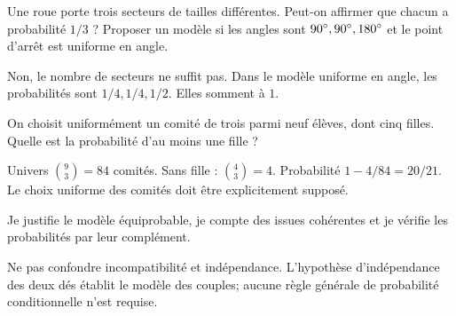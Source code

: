 \label{t11s-c20-e06}
Une roue porte trois secteurs de tailles différentes. Peut-on affirmer que chacun a probabilité $1/3$ ? Proposer un modèle si les angles sont $90^{\circ},90^{\circ},180^{\circ}$ et le point d’arrêt est uniforme en angle.
\begin{corrige}\label{sol-t11s-c20-e06}
Non, le nombre de secteurs ne suffit pas. Dans le modèle uniforme en angle, les probabilités sont $1/4,1/4,1/2$. Elles somment à $1$.
\end{corrige}
\label{t11s-c20-e07}
On choisit uniformément un comité de trois parmi neuf élèves, dont cinq filles. Quelle est la probabilité d’au moins une fille ?
\begin{corrige}\label{sol-t11s-c20-e07}
Univers $\binom93=84$ comités. Sans fille : $\binom43=4$. Probabilité $1-4/84=20/21$. Le choix uniforme des comités doit être explicitement supposé.
\end{corrige}
\begin{jemeteste}Je justifie le modèle équiprobable, je compte des issues cohérentes et je vérifie les probabilités par leur complément.\end{jemeteste}
\begin{notepourlaclasse}Ne pas confondre incompatibilité et indépendance. L’hypothèse d’indépendance des deux dés établit le modèle des couples; aucune règle générale de probabilité conditionnelle n’est requise.\end{notepourlaclasse}
